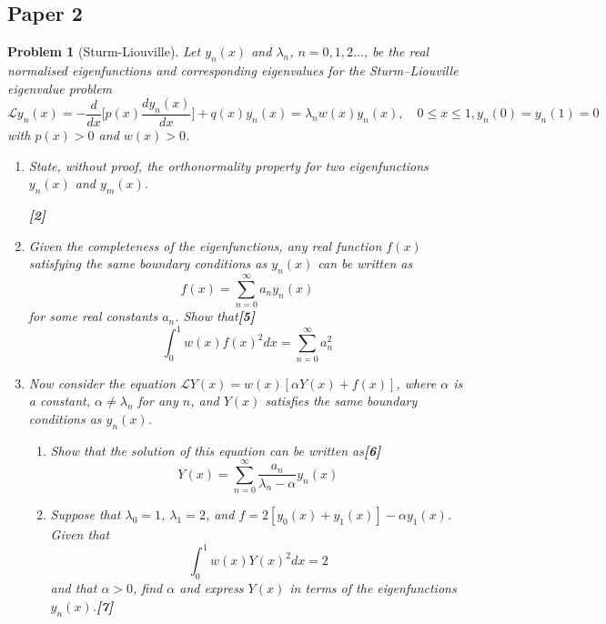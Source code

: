 \documentclass[a4paper]{article}
\theoremstyle{new}
\newtheorem{qns}{Problem}[section]
\begin{document}
\subsection{Paper 2}
\begin{qns}[Sturm-Liouville]
Let $y_n(x)$ and $\lambda_n$, $n = 0, 1, 2...$, be the real normalised eigenfunctions and corresponding eigenvalues for the Sturm–Liouville eigenvalue problem
$$\mathcal{L}y_n(x)=-\frac{d}{dx}\bigg[p(x)\frac{dy_n(x)}{dx}\bigg]+q(x)y_n(x)=\lambda_nw(x)y_n(x),\quad  0\leq x\leq 1,y_n(0)=y_n(1)=0$$
with $p(x)>0$ and $w(x)>0$.
\begin{enumerate}[label=(\alph*)]
\item State, without proof, the orthonormality property for two eigenfunctions $y_n(x)$ and $y_m(x)$.

\hfill\textbf{[2]}
\item Given the completeness of the eigenfunctions, any real function $f(x)$ satisfying the same boundary conditions as $y_n(x)$ can be written as
$$f(x)=\sum_{n=0}^\infty a_ny_n(x)$$
for some real constants $a_n$. Show that\hfill\textbf{[5]}
$$\int_0^1w(x)f(x)^2dx=\sum_{n=0}^\infty a_n^2$$
\item Now consider the equation $\mathcal{L}Y(x)=w(x)[\alpha Y(x)+f(x)]$, where $\alpha$ is a constant, $\alpha\neq\lambda_n$ for any $n$, and $Y (x)$ satisfies the same boundary conditions as $y_n(x)$.
\begin{enumerate}[label=(\roman*)]
\item Show that the solution of this equation can be written as\hfill\textbf{[6]}
$$Y(x)=\sum_{n=0}^\infty\frac{a_n}{\lambda_n-\alpha}y_n(x)$$
\item Suppose that $\lambda_0=1$, $\lambda_1=2$, and $f = 2 [y_0(x) + y_1(x)] −\alpha y_1(x)$. Given that
$$\int_0^1w(x)Y(x)^2dx=2$$
and that $\alpha>0$, find $\alpha$ and express $Y (x)$ in terms of the eigenfunctions $y_n(x)$.\hfill\textbf{[7]}
\end{enumerate}
\end{enumerate}
\end{qns}
\end{document}
